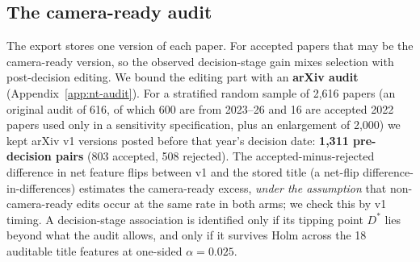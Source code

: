 \subsection{The camera-ready audit}
\label{sec:nt-audit}
The export stores one version of each paper. For accepted papers that may be the camera-ready version, so the observed decision-stage gain mixes selection with post-decision editing. We bound the editing part with an \textbf{arXiv audit} (Appendix~\ref{app:nt-audit}). For a stratified random sample of 2,616 papers (an original audit of 616, of which 600 are from 2023--26 and 16 are accepted 2022 papers used only in a sensitivity specification, plus an enlargement of 2,000) we kept arXiv v1 versions posted before that year's decision date: \textbf{1,311 pre-decision pairs} (803 accepted, 508 rejected). The accepted-minus-rejected difference in net feature flips between v1 and the stored title (a net-flip difference-in-differences) estimates the camera-ready excess, \emph{under the assumption} that non-camera-ready edits occur at the same rate in both arms; we check this by v1 timing. A decision-stage association is identified only if its tipping point $D^*$ lies beyond what the audit allows, and only if it survives Holm across the 18 auditable title features at one-sided $\alpha=0.025$.

